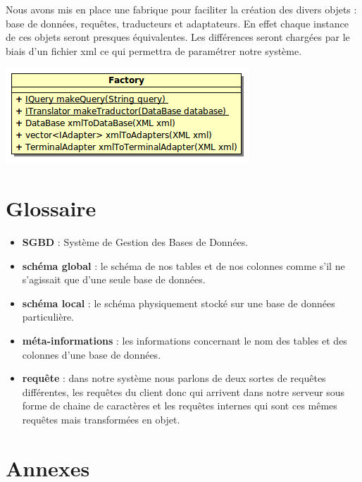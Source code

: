\documentclass[12pt]{article}
\begin{document}
Nous avons mis en place une fabrique pour faciliter la création des divers objets : base de données, requêtes, traducteurs et adaptateurs. En effet chaque instance de ces objets seront presques équivalentes. Les différences seront chargées par le biais d'un fichier xml ce qui permettra de paramétrer notre système.

\begin{center}
	\includegraphics[scale=0.6]{images/Factory.png}
\end{center}

\newpage

\section{Glossaire}

	\begin{itemize}
		\item \textbf{SGBD} : Système de Gestion des Bases de Données.\\
		\item \textbf{schéma global} : le schéma de nos tables et de nos colonnes comme s'il ne s'agissait que d'une seule base de données.\\
		\item \textbf{schéma local} : le schéma physiquement stocké sur une base de données particulière.\\
		\item \textbf{méta-informations} : les informations concernant le nom des tables et des colonnes d'une base de données.\\
		\item \textbf{requête} : dans notre système nous parlons de deux sortes de requêtes différentes, les requêtes du client donc qui arrivent dans notre serveur sous forme de chaine de caractères et les requêtes internes qui sont ces mêmes requêtes mais transformées en objet.\\
	\end{itemize}
\newpage
\section{Annexes}
\end{document}
